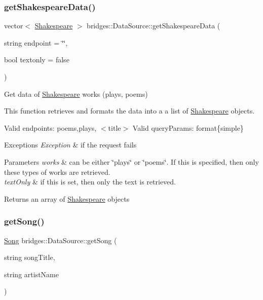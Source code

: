 \subsubsection{\texorpdfstring{get\+Shakespeare\+Data()}{getShakespeareData()}}
{\footnotesize\ttfamily vector$<$ \mbox{\hyperlink{classbridges_1_1_shakespeare}{Shakespeare}} $>$ bridges\+::\+Data\+Source\+::get\+Shakespeare\+Data (\begin{DoxyParamCaption}\item[{string}]{endpoint = {\ttfamily \char`\"{}\char`\"{}},  }\item[{bool}]{textonly = {\ttfamily false} }\end{DoxyParamCaption})}

Get data of \mbox{\hyperlink{classbridges_1_1_shakespeare}{Shakespeare}} works (plays, poems)

This function retrieves and formats the data into a a list of \mbox{\hyperlink{classbridges_1_1_shakespeare}{Shakespeare}} objects.

Valid endpoints\+: \textquotesingle{}poems\textquotesingle{},\textquotesingle{}plays\textquotesingle{}, $<$title$>$ Valid query\+Params\+: format\{simple\}


\begin{DoxyExceptions}{Exceptions}
{\em Exception} & if the request fails\\
\hline
\end{DoxyExceptions}

\begin{DoxyParams}{Parameters}
{\em works} & can be either \char`\"{}plays\char`\"{} or \char`\"{}poems\char`\"{}. If this is specified, then only these types of works are retrieved. \\
\hline
{\em text\+Only} & if this is set, then only the text is retrieved.\\
\hline
\end{DoxyParams}
\begin{DoxyReturn}{Returns}
an array of \mbox{\hyperlink{classbridges_1_1_shakespeare}{Shakespeare}} objects 
\end{DoxyReturn}
\mbox{\label{namespacebridges_1_1_data_source_a284c9d572415b67df6989ab8ab97d0e2}} 
\subsubsection{\texorpdfstring{get\+Song()}{getSong()}}
{\footnotesize\ttfamily \mbox{\hyperlink{classbridges_1_1_song}{Song}} bridges\+::\+Data\+Source\+::get\+Song (\begin{DoxyParamCaption}\item[{string}]{song\+Title,  }\item[{string}]{artist\+Name }\end{DoxyParamCaption})}

